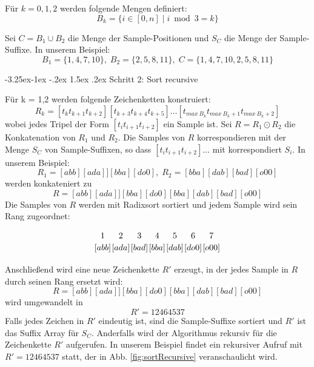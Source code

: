 \documentclass[12pt]{report}
\makeatletter
\renewcommand\paragraph{\@startsection{paragraph}{4}{\z@}%
    {-3.25ex\@plus -1ex \@minus -.2ex}%
    {1.5ex \@plus .2ex}%
    {\normalfont\normalsize\bfseries}}
\makeatother
\begin{document}
Für $k = 0,1,2$ werden folgende Mengen definiert:
$$
B_k = \{ i \in [0,n] \mid i \bmod{3} = k\}
$$

Sei $C = B_1 \cup B_2$ die Menge der Sample-Positionen und $S_C$ die Menge der Sample-Suffixe. In unserem Beispiel:
$$
B_1 = \{1,4,7,10\},\;B_2 = \{2,5,8,11\},\;C = \{1,4,7,10,2,5,8,11\}
$$

\paragraph{Schritt 2: Sort recursive}

Für k = 1,2 werden folgende Zeichenketten konstruiert:
$$
R_k = [t_k t_{k+1} t_{k+2}][t_{k+3} t_{k+4} t_{k+5}] \dots [t_{max\:B_k} t_{max\:B_k + 1} t_{max\:B_k + 2}]
$$
wobei jedes Tripel der Form $[t_i t_{i+1} t_{i+2}]$ ein Sample ist. Sei $R = R_1 \odot R_2$ die Konkatenation von $R_1$ und $R_2$. Die Samples von $R$ korrespondieren mit der Menge $S_C$ von Sample-Suffixen, so dass $[t_i t_{i+1} t_{i+2}] \dots$ mit korrespondiert $S_i$. In unserem Beispiel:
$$
R_1 = [abb][ada]][bba][do0],\;R_2 = [bba][dab][bad][o00]
$$
werden konkateniert zu
$$
R = [abb][ada]][bba][do0][bba][dab][bad][o00]
$$
Die Samples von $R$ werden mit Radixsort sortiert und jedem Sample wird sein Rang zugeordnet:
$$
\centering
\begin{tikzpicture}
    [
        matrix of nodes/.style = {
        execute at begin cell = \node\bgroup,
        execute at end cell = \egroup;%
    }]
    \matrix[ampersand replacement = \&, column sep = -2mm, matrix of nodes]
    {
        $1$ \&
        $2$\&
        $3$ \&
        $4$ \&
        $5$ \&
        $6$ \&
        $7$ \\
        \color{black}$[abb]$ \&
        \color{black}$[ada]$ \&
        \color{black}$[bad]$ \&
        \color{black}$[bba]$ \&
        \color{black}$[dab]$ \&
        \color{black}$[do0]$ \&
        \color{black}$[o00]$ \\
    };
\end{tikzpicture}
$$
Anschließend wird eine neue Zeichenkette $R'$ erzeugt, in der jedes Sample in $R$ durch seinen Rang ersetzt wird:
$$
R = [abb][ada]][bba][do0][bba][dab][bad][o00]
$$
wird umgewandelt in
$$
R' = 12464537
$$
Falls jedes Zeichen in $R'$ eindeutig ist, sind die Sample-Suffixe sortiert und $R'$ ist das Suffix Array für $S_C$. Anderfalls wird der Algorithmus rekursiv für die Zeichenkette $R'$ aufgerufen. In unserem Beispiel findet ein rekursiver Aufruf mit $R' = 12464537$ statt, der in Abb. \ref{fig:sortRecursive} veranschaulicht wird.
\end{document}
